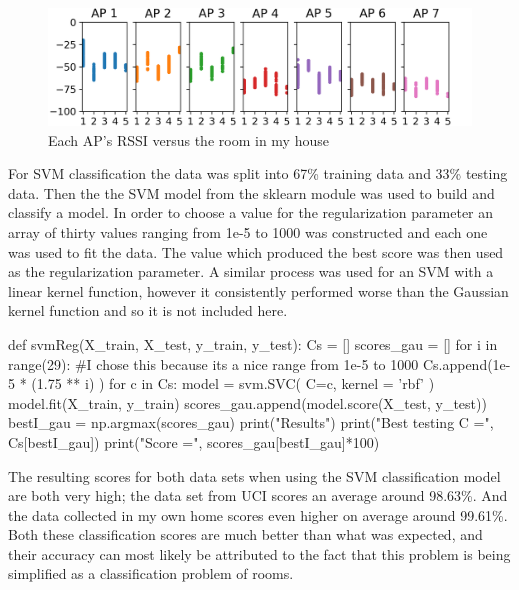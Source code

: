 \documentclass[12pt,letterpaper]{article}
\begin{document}
\begin{figure}[H]

  \includegraphics[width=170mm]{mygph.png}
  \caption{Each AP's RSSI versus the room in my house}
  \label{fig:myRSSI}

\end{figure}


For SVM classification the data was split into 67\% training data and 33\% testing data. Then the the SVM model from the sklearn module was used to build and classify a model. In order to choose a value for the regularization parameter an array of thirty values ranging from 1e-5 to 1000 was constructed and each one was used to fit the data. The value which produced the best score was then used as the regularization parameter. A similar process was used for an SVM with a linear kernel function, however it consistently performed worse than the Gaussian kernel function and so it is not included here.

\begin{python}
def svmReg(X_train, X_test, y_train, y_test):
    Cs = []
    scores_gau = []        
    for i in range(29):
        #I chose this because its a nice range from 1e-5 to 1000
        Cs.append(1e-5 * (1.75 ** i) )
    for c in Cs:
        model = svm.SVC( C=c, kernel = 'rbf' )
        model.fit(X_train, y_train)
        scores_gau.append(model.score(X_test, y_test))
    bestI_gau = np.argmax(scores_gau)
    print("\nSVM Results")
    print("Best testing C =", Cs[bestI_gau])
    print("Score =", scores_gau[bestI_gau]*100)
\end{python}

\par The resulting scores for both data sets when using the SVM classification model are both very high; the data set from UCI scores an average around 98.63\%. And the data collected in my own home scores even higher on average around 99.61\%. Both these classification scores are much better than what was expected, and their accuracy can most likely be attributed to the fact that this problem is being simplified as a classification problem of rooms.
\end{document}
